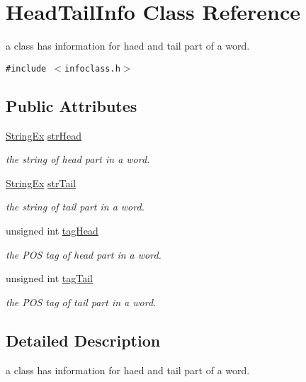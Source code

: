 \hypertarget{classHeadTailInfo}{
\section{HeadTailInfo Class Reference}
\label{classHeadTailInfo}
}
a class has information for haed and tail part of a word.  


{\tt \#include $<$infoclass.h$>$}

\subsection*{Public Attributes}
\begin{CompactItemize}
\item 
\hyperlink{classStringEx}{StringEx} \hyperlink{classHeadTailInfo_ba8041dd8d510cda99e7bb5ef781c095}{strHead}
\begin{CompactList}\small\item\em the string of head part in a word. \item\end{CompactList}\item 
\hyperlink{classStringEx}{StringEx} \hyperlink{classHeadTailInfo_ec9d1ca7e23e1b009dfe3600e89c87dd}{strTail}
\begin{CompactList}\small\item\em the string of tail part in a word. \item\end{CompactList}\item 
unsigned int \hyperlink{classHeadTailInfo_72bdf86b43f7686bc5ea5fdd823e6f44}{tagHead}
\begin{CompactList}\small\item\em the POS tag of head part in a word. \item\end{CompactList}\item 
unsigned int \hyperlink{classHeadTailInfo_34d4df1cd05943843a8055059e3afefb}{tagTail}
\begin{CompactList}\small\item\em the POS tag of tail part in a word. \item\end{CompactList}\end{CompactItemize}


\subsection{Detailed Description}
a class has information for haed and tail part of a word. 


